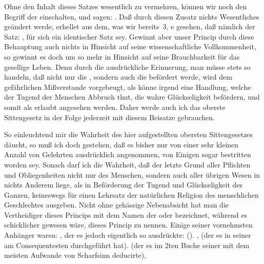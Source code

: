\begin{aufza}
\item Ohne den Inhalt dieses Satzes wesentlich zu vermehren, können wir noch den Begriff der  einschalten, und sagen: . Daß durch diesen Zusatz nichts Wesentliches geändert werde, erhellet aus dem, was wir bereits \no\,3, e gesehen, daß nämlich der Satz: , für sich ein identischer Satz sey. Gewinnt aber unser Princip durch diese Behauptung auch nichts in Hinsicht auf seine wissenschaftliche Vollkommenheit, so gewinnt es doch um so mehr in Hinsicht auf seine Brauchbarkeit für das gesellige Leben. Denn durch die ausdrückliche Erinnerung, man müsse stets so handeln, daß nicht nur die , sondern auch die  befördert werde, wird dem gefährlichen Mißverstande vorgebeugt, als könne irgend eine Handlung, welche der Tugend der Menschen Abbruch thut, die wahre Glückseligkeit befördern, und somit als erlaubt angesehen werden. Daher werde auch ich das oberste Sittengesetz in der Folge jederzeit mit diesem Beisatze gebrauchen.
\end{aufza}
\begin{RWanm}
So einleuchtend mir die Wahrheit des hier aufgestellten obersten Sittengesetzes däucht, so muß ich doch gestehen, daß es bisher nur von einer sehr kleinen Anzahl von Gelehrten ausdrücklich angenommen, von Einigen sogar bestritten worden sey. Sonach darf ich die Wahrheit, daß der letzte Grund aller Pflichten und Obliegenheiten nicht nur des Menschen, sondern auch aller übrigen Wesen in nichts Anderem liege, als in Beförderung der Tugend und Glückseligkeit des Ganzen, keineswegs für einen Lehrsatz der natürlichen Religion des menschlichen Geschlechtes ausgeben. Nicht ohne gehässige Nebenabsicht hat man die Vertheidiger dieses Princips mit dem Namen der  oder  bezeichnet, während es schicklicher gewesen wäre, dieses Princip  zu nennen. Einige seiner vornehmsten Anhänger waren: , der es jedoch eigentlich so ausdrückte:  (). ,  (der es in seiner  am Consequentesten durchgeführt hat).  (der es im 2ten Buche seiner  mit dem meisten Aufwande von Scharfsinn deducirte), \umA
\end{RWanm}

